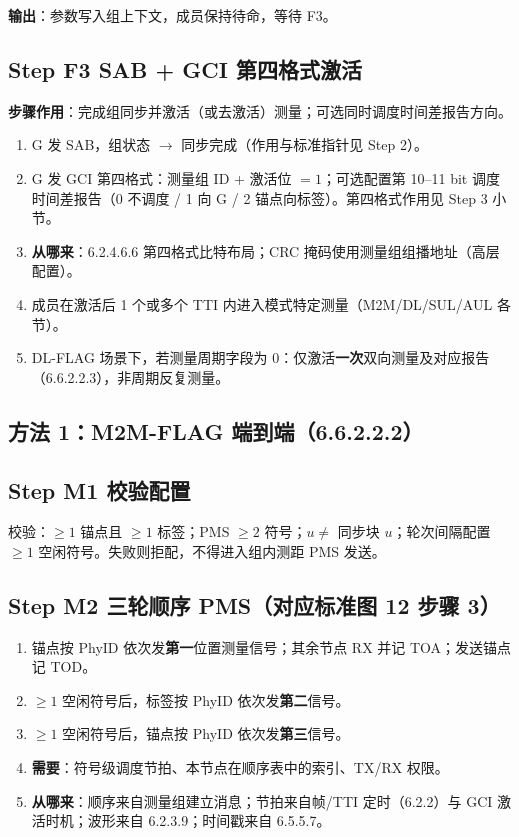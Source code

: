 \documentclass[11pt,a4paper]{ctexart}
\begin{document}
\textbf{输出}：参数写入组上下文，成员保持待命，等待 F3。

\subsection{Step F3 SAB + GCI 第四格式激活}

\textbf{步骤作用}：完成组同步并激活（或去激活）测量；可选同时调度时间差报告方向。

\begin{enumerate}
  \item G 发 SAB，组状态 $\rightarrow$ 同步完成（作用与标准指针见 Step 2）。
  \item G 发 GCI 第四格式：测量组 ID + 激活位 $=1$；可选配置第 10--11 bit 调度时间差报告（0 不调度 / 1 向 G / 2 锚点向标签）。第四格式作用见 Step 3 小节。
  \item \textbf{从哪来}：6.2.4.6.6 第四格式比特布局；CRC 掩码使用测量组组播地址（高层配置）。
  \item 成员在激活后 1 个或多个 TTI 内进入模式特定测量（M2M/DL/SUL/AUL 各节）。
  \item DL-FLAG 场景下，若测量周期字段为 0：仅激活\textbf{一次}双向测量及对应报告（6.6.2.2.3），非周期反复测量。
\end{enumerate}

\subsection{方法 1：M2M-FLAG 端到端（6.6.2.2.2）}

\subsection{Step M1 校验配置}

校验：$\ge 1$ 锚点且 $\ge 1$ 标签；PMS $\ge 2$ 符号；$u\neq$ 同步块 $u$；轮次间隔配置 $\ge 1$ 空闲符号。失败则拒配，不得进入组内测距 PMS 发送。

\subsection{Step M2 三轮顺序 PMS（对应标准图 12 步骤 3）}

\begin{enumerate}
  \item 锚点按 PhyID 依次发\textbf{第一}位置测量信号；其余节点 RX 并记 TOA；发送锚点记 TOD。
  \item $\ge 1$ 空闲符号后，标签按 PhyID 依次发\textbf{第二}信号。
  \item $\ge 1$ 空闲符号后，锚点按 PhyID 依次发\textbf{第三}信号。
  \item \textbf{需要}：符号级调度节拍、本节点在顺序表中的索引、TX/RX 权限。
  \item \textbf{从哪来}：顺序来自测量组建立消息；节拍来自帧/TTI 定时（6.2.2）与 GCI 激活时机；波形来自 6.2.3.9；时间戳来自 6.5.5.7。
\end{enumerate}
\end{document}
